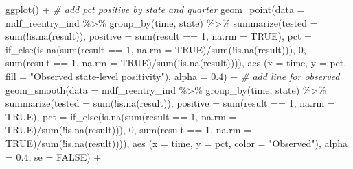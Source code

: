 \documentclass[
]{article}
\newenvironment{Shaded}{\begin{snugshade}}{\end{snugshade}}
\newcommand{\AttributeTok}[1]{\textcolor[rgb]{0.77,0.63,0.00}{#1}}
\newcommand{\CommentTok}[1]{\textcolor[rgb]{0.56,0.35,0.01}{\textit{#1}}}
\newcommand{\ConstantTok}[1]{\textcolor[rgb]{0.00,0.00,0.00}{#1}}
\newcommand{\DecValTok}[1]{\textcolor[rgb]{0.00,0.00,0.81}{#1}}
\newcommand{\FloatTok}[1]{\textcolor[rgb]{0.00,0.00,0.81}{#1}}
\newcommand{\FunctionTok}[1]{\textcolor[rgb]{0.00,0.00,0.00}{#1}}
\newcommand{\NormalTok}[1]{#1}
\newcommand{\SpecialCharTok}[1]{\textcolor[rgb]{0.00,0.00,0.00}{#1}}
\newcommand{\StringTok}[1]{\textcolor[rgb]{0.31,0.60,0.02}{#1}}
\begin{document}
\begin{Shaded}
\begin{Highlighting}[]
\FunctionTok{ggplot}\NormalTok{() }\SpecialCharTok{+}
  \CommentTok{\# add pct positive by state and quarter}
  \FunctionTok{geom\_point}\NormalTok{(}\AttributeTok{data =}\NormalTok{ mdf\_reentry\_ind }\SpecialCharTok{\%\textgreater{}\%} 
               \FunctionTok{group\_by}\NormalTok{(time, state) }\SpecialCharTok{\%\textgreater{}\%} 
               \FunctionTok{summarize}\NormalTok{(}\AttributeTok{tested =} \FunctionTok{sum}\NormalTok{(}\SpecialCharTok{!}\FunctionTok{is.na}\NormalTok{(result)),}
                         \AttributeTok{positive =} \FunctionTok{sum}\NormalTok{(result }\SpecialCharTok{==} \DecValTok{1}\NormalTok{, }\AttributeTok{na.rm =} \ConstantTok{TRUE}\NormalTok{), }
                         \AttributeTok{pct =} \FunctionTok{if\_else}\NormalTok{(}\FunctionTok{is.na}\NormalTok{(}\FunctionTok{sum}\NormalTok{(result }\SpecialCharTok{==} \DecValTok{1}\NormalTok{, }\AttributeTok{na.rm =} \ConstantTok{TRUE}\NormalTok{)}\SpecialCharTok{/}\FunctionTok{sum}\NormalTok{(}\SpecialCharTok{!}\FunctionTok{is.na}\NormalTok{(result))), }\DecValTok{0}\NormalTok{, }\FunctionTok{sum}\NormalTok{(result }\SpecialCharTok{==} \DecValTok{1}\NormalTok{, }\AttributeTok{na.rm =} \ConstantTok{TRUE}\NormalTok{)}\SpecialCharTok{/}\FunctionTok{sum}\NormalTok{(}\SpecialCharTok{!}\FunctionTok{is.na}\NormalTok{(result)))), }
             \FunctionTok{aes}\NormalTok{ (}\AttributeTok{x =}\NormalTok{ time, }\AttributeTok{y =}\NormalTok{ pct, }\AttributeTok{fill =} \StringTok{"Observed state{-}level positivity"}\NormalTok{), }\AttributeTok{alpha =} \FloatTok{0.4}\NormalTok{) }\SpecialCharTok{+} 
  \CommentTok{\# add line for observed}
   \FunctionTok{geom\_smooth}\NormalTok{(}\AttributeTok{data =}\NormalTok{ mdf\_reentry\_ind }\SpecialCharTok{\%\textgreater{}\%} 
               \FunctionTok{group\_by}\NormalTok{(time, state) }\SpecialCharTok{\%\textgreater{}\%} 
               \FunctionTok{summarize}\NormalTok{(}\AttributeTok{tested =} \FunctionTok{sum}\NormalTok{(}\SpecialCharTok{!}\FunctionTok{is.na}\NormalTok{(result)),}
                         \AttributeTok{positive =} \FunctionTok{sum}\NormalTok{(result }\SpecialCharTok{==} \DecValTok{1}\NormalTok{, }\AttributeTok{na.rm =} \ConstantTok{TRUE}\NormalTok{), }
                         \AttributeTok{pct =} \FunctionTok{if\_else}\NormalTok{(}\FunctionTok{is.na}\NormalTok{(}\FunctionTok{sum}\NormalTok{(result }\SpecialCharTok{==} \DecValTok{1}\NormalTok{, }\AttributeTok{na.rm =} \ConstantTok{TRUE}\NormalTok{)}\SpecialCharTok{/}\FunctionTok{sum}\NormalTok{(}\SpecialCharTok{!}\FunctionTok{is.na}\NormalTok{(result))), }\DecValTok{0}\NormalTok{, }\FunctionTok{sum}\NormalTok{(result }\SpecialCharTok{==} \DecValTok{1}\NormalTok{, }\AttributeTok{na.rm =} \ConstantTok{TRUE}\NormalTok{)}\SpecialCharTok{/}\FunctionTok{sum}\NormalTok{(}\SpecialCharTok{!}\FunctionTok{is.na}\NormalTok{(result)))), }
             \FunctionTok{aes}\NormalTok{ (}\AttributeTok{x =}\NormalTok{ time, }\AttributeTok{y =}\NormalTok{ pct, }\AttributeTok{color =} \StringTok{"Observed"}\NormalTok{), }\AttributeTok{alpha =} \FloatTok{0.4}\NormalTok{, }\AttributeTok{se =} \ConstantTok{FALSE}\NormalTok{) }\SpecialCharTok{+} 
  

\end{Highlighting}
\end{Shaded}
\end{document}
